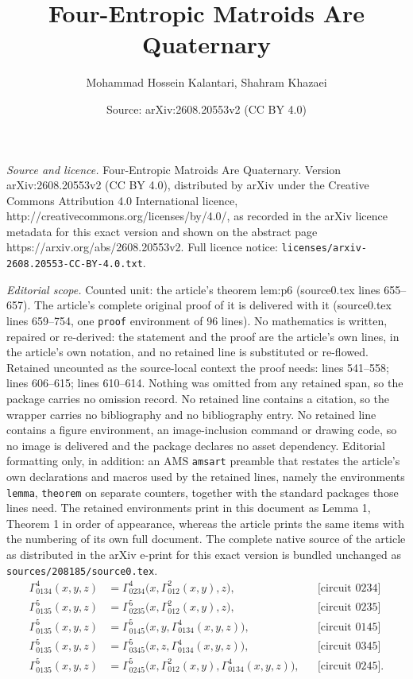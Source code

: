\documentclass[10pt,a4paper]{amsart}
\title{Four-Entropic Matroids Are Quaternary}
\author{Mohammad Hossein Kalantari, Shahram Khazaei}
\date{Source: arXiv:2608.20553v2 (CC BY 4.0)}
\newcommand{\circuittag}[1]{\text{[circuit $#1$]}}
\begin{document}
\maketitle

\noindent\emph{Source and licence.} Four-Entropic Matroids Are Quaternary. Version arXiv:2608.20553v2 (CC BY 4.0), distributed by arXiv under the Creative Commons Attribution 4.0 International licence, http://creativecommons.org/licenses/by/4.0/, as recorded in the arXiv licence metadata for this exact version and shown on the abstract page https://arxiv.org/abs/2608.20553v2. Full licence notice: \texttt{licenses/arxiv-2608.20553-CC-BY-4.0.txt}.\par\smallskip

\noindent\textit{Editorial scope.} Counted unit: the article's theorem lem:p6 (source0.tex lines 655--657). The article's complete original proof of it is delivered with it (source0.tex lines 659--754, one \texttt{proof} environment of 96 lines). No mathematics is written, repaired or re-derived: the statement and the proof are the article's own lines, in the article's own notation, and no retained line is substituted or re-flowed.  Retained uncounted as the source-local context the proof needs: lines 541--558; lines 606--615; lines 610--614.  Nothing was omitted from any retained span, so the package carries no omission record.  No retained line contains a citation, so the wrapper carries no bibliography and no bibliography entry.  No retained line contains a figure environment, an image-inclusion command or drawing code, so no image is delivered and the package declares no asset dependency.  Editorial formatting only, in addition: an AMS \texttt{amsart} preamble that restates the article's own declarations and macros used by the retained lines, namely the environments \texttt{lemma}, \texttt{theorem} on separate counters, together with the standard packages those lines need.  The retained environments print in this document as Lemma 1, Theorem 1 in order of appearance, whereas the article prints the same items with the numbering of its own full document.  The complete native source of the article as distributed in the arXiv e-print for this exact version is bundled unchanged as \texttt{sources/208185/source0.tex}.
\begin{align}
\Gamma_{0134}^{4}(x,y,z)
 &=\Gamma_{0234}^{4}\bigl(x,\Gamma_{012}^{2}(x,y),z\bigr),
 &&\circuittag{0234}\label{eq:p6g1}\\
\Gamma_{0135}^{5}(x,y,z)
 &=\Gamma_{0235}^{5}\bigl(x,\Gamma_{012}^{2}(x,y),z\bigr),
 &&\circuittag{0235}\label{eq:p6g2}\\
\Gamma_{0135}^{5}(x,y,z)
 &=\Gamma_{0145}^{5}\bigl(x,y,\Gamma_{0134}^{4}(x,y,z)\bigr),
 &&\circuittag{0145}\label{eq:p6g3}\\
\Gamma_{0135}^{5}(x,y,z)
 &=\Gamma_{0345}^{5}\bigl(x,z,\Gamma_{0134}^{4}(x,y,z)\bigr),
 &&\circuittag{0345}\label{eq:p6g4}\\
\Gamma_{0135}^{5}(x,y,z)
 &=\Gamma_{0245}^{5}\bigl(x,\Gamma_{012}^{2}(x,y),
       \Gamma_{0134}^{4}(x,y,z)\bigr),
 &&\circuittag{0245}.\label{eq:p6g5}
\end{align}
\end{document}
